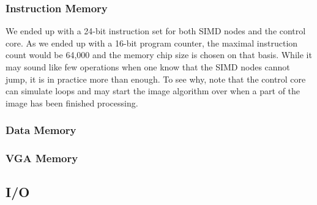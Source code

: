 \subsubsection*{Instruction Memory}

We ended up with a 24-bit instruction set for both SIMD nodes and the control
core. As we ended up with a 16-bit program counter, the maximal instruction
count would be 64,000 and the memory chip size is chosen on that basis. While it
may sound like few operations when one know that the SIMD nodes cannot jump, it
is in practice more than enough. To see why, note that the control core can
simulate loops and may start the image algorithm over when a part of the image
has been finished processing.

\subsubsection*{Data Memory}

\subsubsection*{VGA Memory}

\subsection{I/O}


